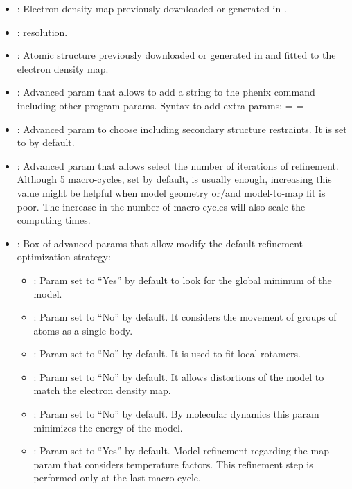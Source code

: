 \begin{itemize}
    \begin{itemize}
     \item {}: Electron density map previously downloaded or generated in \scipion.
     \item {}:  resolution.
     \item {}: Atomic structure previously downloaded or generated in \scipion and fitted to the electron density map.
     \item {}: Advanced param that allows to add a string to the phenix command including other  program params. Syntax to add extra params:  =   = 
     \item {}: Advanced param to choose including secondary structure restraints. It is set to  by default.
     \item {}: Advanced param that allows select the number of iterations of refinement. Although 5 macro-cycles, set by default, is usually enough, increasing this value might be helpful when model geometry or/and model-to-map fit is poor. The increase in the number of macro-cycles will also scale the computing times.
     \item {}: Box of advanced params that allow modify the default refinement optimization strategy:
      \begin{itemize}
       \item {}: Param set to ``Yes'' by default to look for the global minimum of the model. 
       \item {}: Param set to ``No'' by default. It considers the movement of groups of atoms as a single body.
       \item {}: Param set to ``No'' by default. It is used to fit local rotamers.
       \item {}: Param set to ``No'' by default. It allows distortions of the model to match the electron density map.
       \item {}: Param set to ``No'' by default. By molecular dynamics this param minimizes the energy of the model.
       \item {}: Param set to ``Yes'' by default. Model refinement regarding the map param that considers temperature factors. This refinement step is performed only at the last macro-cycle.
      \end{itemize}
    \end{itemize}
 

\end{itemize}
